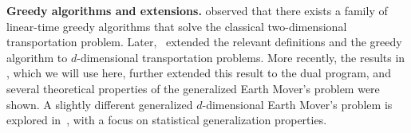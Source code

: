
{\bf Greedy algorithms and extensions.}
\cite{hoffman1963simple} observed that there exists a family of linear-time greedy algorithms that solve the classical two-dimensional transportation problem. %
Later,~\cite{BEIN199597} extended
the relevant definitions and the greedy algorithm to $d$-dimensional transportation problems.
More recently, the results in \cite{kline2019properties}, 
which we will use here, further extended this result to the dual program,  
and several theoretical properties of the generalized Earth Mover's problem were shown. 
A slightly different generalized 
$d$-dimensional Earth Mover's problem is explored in~\cite{erickson2020generalization}, 
with a focus on statistical generalization properties.






